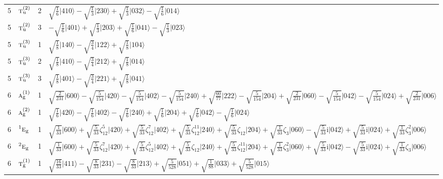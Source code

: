 \documentclass[11pt]{article}
\newcommand{\irr}[1]{\text{\normalfont\scshape #1}}
\newcommand{\conjpair}[1]{{}^{#1}}
\newcommand{\ptag}[1]{\mathrm{#1}}
\newcommand{\iunit}{\mathrm{i}}
\newcommand{\rootunity}[1]{\zeta_{#1}}
\newcommand{\occ}[1]{\lvert #1\rangle}
\begin{document}
\begin{longtable}{c l c p{}}
5 & $\irr{t}_{\ptag{u}}^{(2)}$ & 2 & $\sqrt{\tfrac{1}{6}}\occ{410}-\sqrt{\tfrac{1}{3}}\occ{230}+\sqrt{\tfrac{1}{3}}\occ{032}-\sqrt{\tfrac{1}{6}}\occ{014}$\\
5 & $\irr{t}_{\ptag{u}}^{(2)}$ & 3 & $-\sqrt{\tfrac{1}{6}}\occ{401}+\sqrt{\tfrac{1}{3}}\occ{203}+\sqrt{\tfrac{1}{6}}\occ{041}-\sqrt{\tfrac{1}{3}}\occ{023}$\\
5 & $\irr{t}_{\ptag{u}}^{(3)}$ & 1 & $\sqrt{\tfrac{1}{8}}\occ{140}-\sqrt{\tfrac{3}{4}}\occ{122}+\sqrt{\tfrac{1}{8}}\occ{104}$\\
5 & $\irr{t}_{\ptag{u}}^{(3)}$ & 2 & $\sqrt{\tfrac{1}{8}}\occ{410}-\sqrt{\tfrac{3}{4}}\occ{212}+\sqrt{\tfrac{1}{8}}\occ{014}$\\
5 & $\irr{t}_{\ptag{u}}^{(3)}$ & 3 & $\sqrt{\tfrac{1}{8}}\occ{401}-\sqrt{\tfrac{3}{4}}\occ{221}+\sqrt{\tfrac{1}{8}}\occ{041}$\\
\hline
6 & $\irr{a}_{\ptag{g}}^{(1)}$ & 1 & $\sqrt{\tfrac{2}{231}}\occ{600}-\sqrt{\tfrac{5}{154}}\occ{420}-\sqrt{\tfrac{5}{154}}\occ{402}-\sqrt{\tfrac{5}{154}}\occ{240}+\sqrt{\tfrac{60}{77}}\occ{222}-\sqrt{\tfrac{5}{154}}\occ{204}+\sqrt{\tfrac{2}{231}}\occ{060}-\sqrt{\tfrac{5}{154}}\occ{042}-\sqrt{\tfrac{5}{154}}\occ{024}+\sqrt{\tfrac{2}{231}}\occ{006}$\\
6 & $\irr{a}_{\ptag{g}}^{(2)}$ & 1 & $\sqrt{\tfrac{1}{6}}\occ{420}-\sqrt{\tfrac{1}{6}}\occ{402}-\sqrt{\tfrac{1}{6}}\occ{240}+\sqrt{\tfrac{1}{6}}\occ{204}+\sqrt{\tfrac{1}{6}}\occ{042}-\sqrt{\tfrac{1}{6}}\occ{024}$\\
6 & $\conjpair{1}\irr{e}_{\ptag{g}}$ & 1 & $\sqrt{\tfrac{1}{33}}\occ{600}+\sqrt{\tfrac{5}{33}}\rootunity{12}^{5}\occ{420}+\sqrt{\tfrac{5}{33}}\rootunity{12}^{7}\occ{402}+\sqrt{\tfrac{5}{33}}\rootunity{12}^{11}\occ{240}+\sqrt{\tfrac{5}{33}}\rootunity{12}\occ{204}+\sqrt{\tfrac{1}{33}}\rootunity{3}\occ{060}-\sqrt{\tfrac{5}{33}}\iunit\occ{042}+\sqrt{\tfrac{5}{33}}\iunit\occ{024}+\sqrt{\tfrac{1}{33}}\rootunity{3}^{2}\occ{006}$\\
6 & $\conjpair{2}\irr{e}_{\ptag{g}}$ & 1 & $\sqrt{\tfrac{1}{33}}\occ{600}+\sqrt{\tfrac{5}{33}}\rootunity{12}^{7}\occ{420}+\sqrt{\tfrac{5}{33}}\rootunity{12}^{5}\occ{402}+\sqrt{\tfrac{5}{33}}\rootunity{12}\occ{240}+\sqrt{\tfrac{5}{33}}\rootunity{12}^{11}\occ{204}+\sqrt{\tfrac{1}{33}}\rootunity{3}^{2}\occ{060}+\sqrt{\tfrac{5}{33}}\iunit\occ{042}-\sqrt{\tfrac{5}{33}}\iunit\occ{024}+\sqrt{\tfrac{1}{33}}\rootunity{3}\occ{006}$\\
6 & $\irr{t}_{\ptag{g}}^{(1)}$ & 1 & $\sqrt{\tfrac{16}{33}}\occ{411}-\sqrt{\tfrac{8}{33}}\occ{231}-\sqrt{\tfrac{8}{33}}\occ{213}+\sqrt{\tfrac{5}{528}}\occ{051}+\sqrt{\tfrac{1}{88}}\occ{033}+\sqrt{\tfrac{5}{528}}\occ{015}$\\

\end{longtable}
\end{document}
